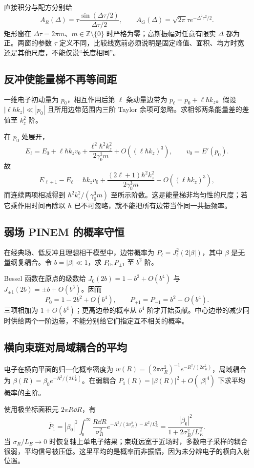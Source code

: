 直接积分与配方分别给
\[
A_R(\Delta)=\tau\frac{\sin(\Delta\tau/2)}{\Delta\tau/2},
\qquad
A_G(\Delta)=\sqrt{2\pi}\tau e^{-\Delta^2\tau^2/2}.
\]
矩形窗在 \(\Delta\tau=2\pi m\)、\(m\in\mathbb Z\setminus\{0\}\) 时严格为零；高斯振幅对任意有限实 \(\Delta\) 都为正。两窗的参数 \(\tau\) 定义不同，比较线宽前必须说明是固定峰值、面积、均方时宽还是其他尺度，不能仅说“长度相同”。

\subsection*{反冲使能量梯不再等间距}
一维电子初动量为 \(p_0\)，相互作用后第 \(\ell\) 条动量边带为 \(p_\ell=p_0+\ell\hbar k_z\)。假设 \(|\ell\hbar k_z|\ll |p_0|\) 且所用边带范围内三阶 Taylor 余项可忽略。求相邻两条能量差的差值至 \(k_z^2\) 阶。

在 \(p_0\) 处展开，
\[
E_\ell=E_0+\ell\hbar k_zv_0
+\frac{\ell^2\hbar^2k_z^2}{2\gamma_0^3m}
+O((\ell\hbar k_z)^3),
\qquad v_0=E'(p_0).
\]
故
\[
E_{\ell+1}-E_\ell
=\hbar k_zv_0
+\frac{(2\ell+1)\hbar^2k_z^2}{2\gamma_0^3m}
+O((\ell\hbar k_z)^3),
\]
而连续两项相减得到 \(\hbar^2k_z^2/(\gamma_0^3m)\) 至所示阶数。这是能量梯非均匀性的尺度；若它乘作用时间再除以 \(\hbar\) 已不可忽略，就不能把所有边带当作同一共振频率。

\subsection*{弱场 PINEM 的概率守恒}
在经典场、低反冲且理想相干模型中，边带概率为 \(P_\ell=J_\ell^2(2|\beta|)\)，其中 \(\beta\) 是无量纲复耦合。令 \(b=|\beta|\ll1\)，求 \(P_0,P_{\pm1}\) 至 \(b^2\) 阶。

Bessel 函数在原点的级数给 \(J_0(2b)=1-b^2+O(b^4)\) 与 \(J_{\pm1}(2b)=\pm b+O(b^3)\)。因而
\[
P_0=1-2b^2+O(b^4),\qquad
P_{+1}=P_{-1}=b^2+O(b^4).
\]
三项相加为 \(1+O(b^4)\)；更高边带的概率从 \(b^4\) 阶才开始贡献。中心边带的减少同时供给两个一阶边带，不能分别给它们指定互不相关的概率。

\subsection*{横向束斑对局域耦合的平均}
电子在横向平面的归一化概率密度为
\(w(R)=(2\pi\sigma_R^2)^{-1}e^{-R^2/(2\sigma_R^2)}\)，局域耦合为
\(\beta(R)=\beta_0e^{-R^2/(2L_E^2)}\)。在弱耦合 \(P_1(R)=|\beta(R)|^2+O(|\beta|^4)\) 下求平均概率的主阶。

使用极坐标面积元 \(2\pi R\dd R\)，有
\[
\overline P_1
=|\beta_0|^2\int_0^\infty
\frac{R\dd R}{\sigma_R^2}
e^{-R^2/(2\sigma_R^2)-R^2/L_E^2}
=\frac{|\beta_0|^2}{1+2\sigma_R^2/L_E^2}.
\]
当 \(\sigma_R/L_E\to0\) 时恢复轴上单电子结果；束斑远宽于近场时，多数电子采样的耦合很弱，平均信号被压低。这里平均的是概率而非振幅，因为未分辨电子的横向入射位置。

